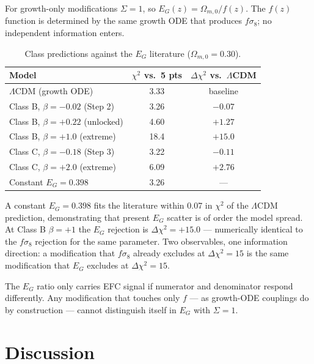 \documentclass[11pt,a4paper]{article}
\begin{document}
For growth-only modifications $\Sigma = 1$, so $E_G(z) = \Omega_{m,0}/f(z)$. The $f(z)$ function is determined by the same growth ODE that produces $f\sigma_8$; no independent information enters.

\begin{table}[!ht]
\centering\small
\caption{Class predictions against the $E_G$ literature ($\Omega_{m,0} = 0.30$).}
\label{tab:eg_chi2}
\begin{tabular}{@{}lcc@{}}
\toprule
Model & $\chi^2$ vs.\ 5 pts & $\Delta\chi^2$ vs.\ $\Lambda$CDM \\
\midrule
$\Lambda$CDM (growth ODE)          & 3.33 & baseline \\
Class B, $\beta = -0.02$ (Step 2)  & 3.26 & $-0.07$ \\
Class B, $\beta = +0.22$ (unlocked) & 4.60 & $+1.27$ \\
Class B, $\beta = +1.0$ (extreme)   & 18.4 & $+15.0$ \\
Class C, $\beta = -0.18$ (Step 3)  & 3.22 & $-0.11$ \\
Class C, $\beta = +2.0$ (extreme)   & 6.09 & $+2.76$ \\
Constant $E_G = 0.398$             & 3.26 & --- \\
\bottomrule
\end{tabular}
\end{table}

A constant $E_G = 0.398$ fits the literature within 0.07 in $\chi^2$ of the $\Lambda$CDM prediction, demonstrating that present $E_G$ scatter is of order the model spread. At Class B $\beta = +1$ the $E_G$ rejection is $\Delta\chi^2 = +15.0$ --- numerically identical to the $f\sigma_8$ rejection for the same parameter. Two observables, one information direction: a modification that $f\sigma_8$ already excludes at $\Delta\chi^2 = 15$ is the same modification that $E_G$ excludes at $\Delta\chi^2 = 15$.

The $E_G$ ratio only carries EFC signal if numerator and denominator respond differently. Any modification that touches only $f$ --- as growth-ODE couplings do by construction --- cannot distinguish itself in $E_G$ with $\Sigma = 1$.

\section{Discussion}
\label{sec:discussion}
\end{document}
